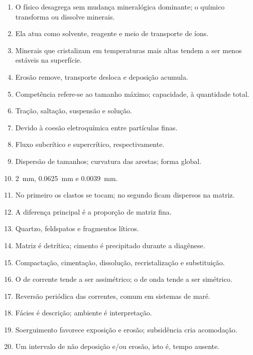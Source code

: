 \begin{enumerate}
  \item O físico desagrega sem mudança mineralógica dominante; o químico transforma ou dissolve minerais.
  \item Ela atua como solvente, reagente e meio de transporte de íons.
  \item Minerais que cristalizam em temperaturas mais altas tendem a ser menos estáveis na superfície.
  \item Erosão remove, transporte desloca e deposição acumula.
  \item Competência refere-se ao tamanho máximo; capacidade, à quantidade total.
  \item Tração, saltação, suspensão e solução.
  \item Devido à coesão eletroquímica entre partículas finas.
  \item Fluxo subcrítico e supercrítico, respectivamente.
  \item Dispersão de tamanhos; curvatura das arestas; forma global.
  \item \SI{2}{\milli\metre}, \SI{0.0625}{\milli\metre} e \SI{0.0039}{\milli\metre}.
  \item No primeiro os clastos se tocam; no segundo ficam dispersos na matriz.
  \item A diferença principal é a proporção de matriz fina.
  \item Quartzo, feldspatos e fragmentos líticos.
  \item Matriz é detrítica; cimento é precipitado durante a diagênese.
  \item Compactação, cimentação, dissolução, recristalização e substituição.
  \item O de corrente tende a ser assimétrico; o de onda tende a ser simétrico.
  \item Reversão periódica das correntes, comum em sistemas de maré.
  \item Fácies é descrição; ambiente é interpretação.
  \item Soerguimento favorece exposição e erosão; subsidência cria acomodação.
  \item Um intervalo de não deposição e/ou erosão, isto é, tempo ausente.
\end{enumerate}
